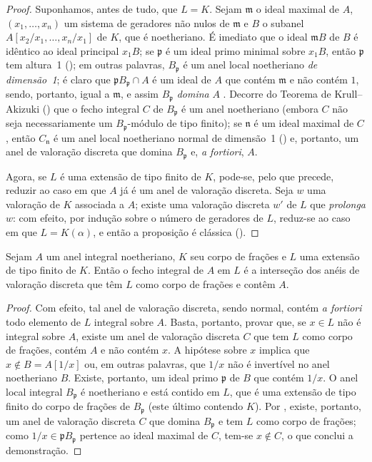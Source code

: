 \documentclass[oneside,10pt]{amsart}
\let\EGAOriginalLabel\label
\renewcommand{\label}[1]{\phantomsection\EGAOriginalLabel{#1}}
\begin{document}
\begin{proof}
Suponhamos, antes de tudo, que $L=K$.
Sejam $\mathfrak{m}$ o ideal maximal de $A$, $(x_1,\ldots,x_n)$ um sistema de geradores não nulos de $\mathfrak{m}$ e $B$ o subanel $A[x_2/x_1,\ldots,x_n/x_1]$ de $K$, que é noetheriano.
É imediato que o ideal $\mathfrak{m}B$ de $B$ é idêntico ao ideal principal $x_1B$;
se $\mathfrak{p}$ é um ideal primo minimal sobre $x_1B$, então $\mathfrak{p}$ tem altura~1 (\cite[t.~I, p.~277]{I-13});
em outras palavras, $B_\mathfrak{p}$ é um anel local noetheriano \emph{de dimensão~1};
é claro que $\mathfrak{p}B_\mathfrak{p}\cap A$ é um ideal de $A$ que contém $\mathfrak{m}$ e não contém $1$, sendo, portanto, igual a $\mathfrak{m}$, e assim $B_\mathfrak{p}$ \emph{domina} $A$ .
Decorre do Teorema de Krull--Akizuki (\cite[p.~293]{II-25}) que o fecho integral $C$ de $B_\mathfrak{p}$ é um anel noetheriano (embora $C$ não seja necessariamente um $B_\mathfrak{p}$-módulo de tipo finito);
se $\mathfrak{n}$ é um ideal maximal de $C$, então $C_\mathfrak{n}$ é um anel local noetheriano normal de dimensão~1 (\cite[p.~295]{II-25}) e, portanto, um anel de valoração discreta que domina $B_\mathfrak{p}$ e, \emph{a fortiori}, $A$.

Agora, se $L$ é uma extensão de tipo finito de $K$, pode-se, pelo que precede, reduzir ao caso em que $A$ já é um anel de valoração discreta.
Seja $w$ uma valoração de $K$ associada a $A$;
existe uma valoração discreta $w'$ de $L$ que \emph{prolonga} $w$: com efeito, por indução sobre o número de geradores de $L$, reduz-se ao caso em que $L=K(\alpha)$, e então a proposição é clássica (\cite[p.~106]{II-24}).
\end{proof}

\begin{corollary}[7.1.8]
\label{II.7.1.8}
Sejam $A$ um anel integral noetheriano, $K$ seu corpo de frações e $L$ uma extensão de tipo finito de $K$.
Então o fecho integral de $A$ em $L$ é a interseção dos anéis de valoração discreta que têm $L$ como corpo de frações e contêm $A$.
\end{corollary}

\begin{proof}
Com efeito, tal anel de valoração discreta, sendo normal, contém \emph{a fortiori} todo elemento de $L$ integral sobre $A$.
Basta, portanto, provar que, se $x\in L$ não é integral sobre $A$, existe um anel de valoração discreta $C$ que tem $L$ como corpo de frações, contém $A$ e não contém $x$.
A hipótese sobre $x$ implica que $x\not\in B=A[1/x]$ ou, em outras palavras, que $1/x$ não é invertível no anel noetheriano $B$.
Existe, portanto, um ideal primo $\mathfrak{p}$ de $B$ que contém $1/x$.
O anel local integral $B_\mathfrak{p}$ é noetheriano e está contido em $L$, que é uma extensão de tipo finito do corpo de frações de $B_\mathfrak{p}$ (este último contendo $K$).
Por , existe, portanto, um anel de valoração discreta $C$ que domina $B_\mathfrak{p}$ e tem $L$ como corpo de frações;
como $1/x\in\mathfrak{p}B_\mathfrak{p}$ pertence ao ideal maximal de $C$, tem-se $x\not\in C$, o que conclui a demonstração.
\end{proof}
\end{document}
